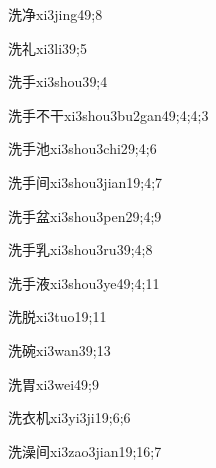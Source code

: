 \begin{verbete}{洗净}{xi3jing4}{9;8}
\end{verbete}
\begin{verbete}{洗礼}{xi3li3}{9;5}
\end{verbete}
\begin{verbete}{洗手}{xi3shou3}{9;4}
\end{verbete}
\begin{verbete}{洗手不干}{xi3shou3bu2gan4}{9;4;4;3}
\end{verbete}
\begin{verbete}{洗手池}{xi3shou3chi2}{9;4;6}
\end{verbete}
\begin{verbete}{洗手间}{xi3shou3jian1}{9;4;7}
\end{verbete}
\begin{verbete}{洗手盆}{xi3shou3pen2}{9;4;9}
\end{verbete}
\begin{verbete}{洗手乳}{xi3shou3ru3}{9;4;8}
\end{verbete}
\begin{verbete}{洗手液}{xi3shou3ye4}{9;4;11}
\end{verbete}
\begin{verbete}{洗脱}{xi3tuo1}{9;11}
\end{verbete}
\begin{verbete}{洗碗}{xi3wan3}{9;13}
\end{verbete}
\begin{verbete}{洗胃}{xi3wei4}{9;9}
\end{verbete}
\begin{verbete}{洗衣机}{xi3yi3ji1}{9;6;6}
\end{verbete}
\begin{verbete}{洗澡间}{xi3zao3jian1}{9;16;7}
\end{verbete}
